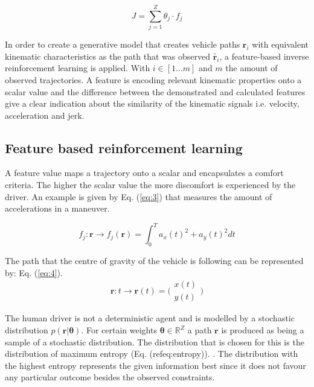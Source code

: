\begin{equation}\label{eq:1}
	J = \sum_{j=1}^{Z}\theta_j\cdot f_j	
\end{equation}


In order to create a generative model that creates vehicle paths $\bm{r}_i$ with equivalent kinematic characteristics as the path that was observed $\tilde{\bm{r}_i}$, a feature-based inverse reinforcement learning is applied. \cite{Kuderer2015a,Abbeel2004} With $i \in [1 ... m]$ and $m$ the amount of observed trajectories. A feature is encoding relevant kinematic properties onto a scalar value and the difference between the demonstrated and calculated features give a clear indication about the similarity of the kinematic signals i.e. velocity, acceleration and jerk. \\

\subsection{Feature based reinforcement learning}
A feature value maps a trajectory onto a scalar and encapsulates a comfort criteria. The higher the scalar value the more discomfort is experienced by the driver. An example is given by Eq. (\ref{eq:3}) that measures the amount of accelerations in a maneuver.

\begin{equation}\label{eq:3}
f_j:\bm{r}\xrightarrow{}f_j(\bm{r})=\int_{0}^{T}a_x(t)^{2}+a_y(t)^{2} dt
\end{equation}

The path that the centre of gravity of the vehicle is following can be represented by: Eq. (\ref{eq:4}).
\begin{equation}\label{eq:4}
\bm{r}:t \xrightarrow{}\bm{r}(t) =  \bigl( \begin{smallmatrix} x(t)\\ y(t) \end{smallmatrix}\bigr)
\end{equation}

The human driver is not a deterministic agent and is modelled by a stochastic distribution $p(\bm{r}|\bm{\theta})$. For certain weights $\bm{\theta} \in \mathbb{R}^Z$ a path $\bm{r}$ is produced as being a sample of a stochastic distribution. The distribution that is chosen for this is the distribution of maximum entropy (Eq. (ref{eq:entropy})). \cite{Ziebart2008, Kretzschmar2014}. 
The distribution with the highest entropy represents the given information best since it does not favour any particular outcome besides the observed constraints. \cite{Abbeel2004}
	
